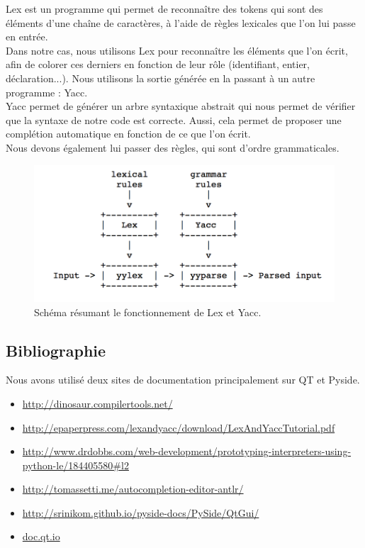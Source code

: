 \documentclass[a4paper,12pt]{article}
\begin{document}
	Lex est un programme qui permet de reconnaître des tokens qui sont des éléments d'une chaîne de caractères, à l'aide de règles lexicales que l'on lui passe en entrée.\\
	Dans notre cas, nous utilisons Lex pour reconnaître les éléments que l'on écrit, afin de colorer ces derniers en fonction de leur rôle (identifiant, entier, déclaration...). Nous utilisons la sortie générée en la passant à un autre programme : Yacc.\\
	
	Yacc permet de générer un arbre syntaxique abstrait qui nous permet de vérifier que la syntaxe de notre code est correcte. Aussi, cela permet de proposer une complétion automatique en fonction de ce que l'on écrit.\\
	Nous devons également lui passer des règles, qui sont d'ordre grammaticales.
	
	\begin{figure}[h!]
		\begin{center}
			\includegraphics[scale=0.7]{images/schema_lex_yacc}
			\caption{Schéma résumant le fonctionnement de Lex et Yacc.}
		\end{center}
	\end{figure}
	
	\subsection{Bibliographie}
	
	Nous avons utilisé deux sites de documentation principalement sur QT et Pyside.
	\begin{itemize}
		\item \url{http://dinosaur.compilertools.net/}
		\item \url{http://epaperpress.com/lexandyacc/download/LexAndYaccTutorial.pdf}
		\item \url{http://www.drdobbs.com/web-development/prototyping-interpreters-using-python-le/184405580#l2}
		\item \url{http://tomassetti.me/autocompletion-editor-antlr/}
		\item \url{http://srinikom.github.io/pyside-docs/PySide/QtGui/}
		\item \url{doc.qt.io}
	\end{itemize}
	
\end{document}
